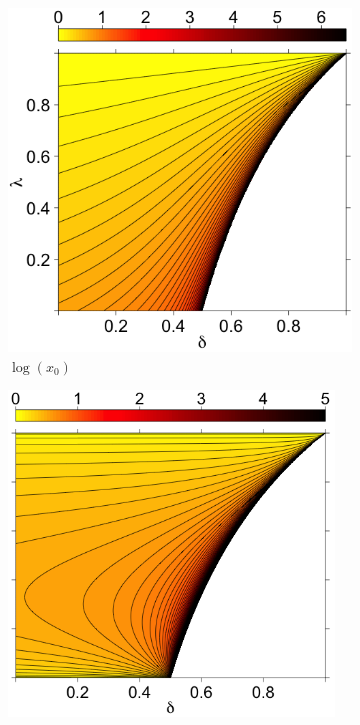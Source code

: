 \documentclass[11pt]{article}
\theoremstyle{definition}
\theoremstyle{definition}
\begin{document}
\begin{figure}[t]
\hspace{-1.2em}
    \centering
    \begin{subfigure}[b]{0.33\textwidth}
        \includegraphics[width=1.07\textwidth, height = \textwidth]{ExtremeX0}
\caption{$\log(x_0)$}	
\label{xOracle}
    \end{subfigure}%
\hspace{0.6em}
    \begin{subfigure}[b]{0.33\textwidth}
        \includegraphics[width= 0.95\textwidth, height = \textwidth]{ExtremeGamma}

\end{subfigure}
\end{figure}
\end{document}
